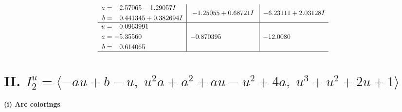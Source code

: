 \documentclass[1p]{elsarticle_modified}
\theoremstyle{definition}
\begin{document}
$$\begin{array}{c|c|c}
\begin{aligned}
a &= \phantom{-}2.57065 - 1.29057 I \\
b &= \phantom{-}0.441345 + 0.382694 I\end{aligned}
 & -1.25055 + 0.68721 I & -6.23111 + 2.03128 I \\ \hline\begin{aligned}
u &= \phantom{-}0.0963991\phantom{ +0.000000I} \\
a &= -5.35560\phantom{ +0.000000I} \\
b &= \phantom{-}0.614065\phantom{ +0.000000I}\end{aligned}
 & -0.870395\phantom{ +0.000000I} & -12.0080\phantom{ +0.000000I}\\
 \hline 
 \end{array}$$\newpage\newpage\renewcommand{\arraystretch}{1}
\centering \section*{II. $I^u_{2}= \langle - a u+b- u,\;u^2 a+a^2+a u- u^2+4 a,\;u^3+u^2+2 u+1 \rangle$}
\flushleft \textbf{(i) Arc colorings}\\
\end{document}
